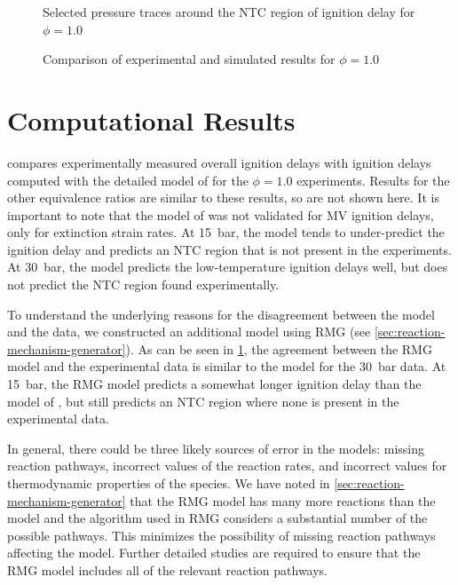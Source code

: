 \documentclass[12pt]{../ussci}
\begin{document}
\begin{figure}[htb]
    \begin{minipage}[t]{0.48\textwidth}
        \centering
        \resizebox{\linewidth}{!}{}
        \caption{Selected pressure traces around the NTC region of ignition delay for $\phi=1.0$}
        \label{fig:pressure-traces}
    \end{minipage}\hfill%
    \begin{minipage}[t]{0.48\textwidth}
        \centering
        \resizebox{\linewidth}{!}{}
        \caption{Comparison of experimental and simulated results for $\phi=1.0$}
        \label{fig:simulation-comparison}
    \end{minipage}
\end{figure}

\section{Computational Results}\label{sec:computational-results}

 compares experimentally measured overall
ignition delays with ignition delays computed with the detailed model of
\textcite{Dievart2013} for the $\phi=1.0$ experiments. Results for the other
equivalence ratios are similar to these results, so are not shown here. It is
important to note that the model of \textcite{Dievart2013} was not validated for
MV ignition delays, only for extinction strain rates. At \SI{15}{\bar}, the
model tends to under-predict the ignition delay and predicts an NTC region that
is not present in the experiments. At \SI{30}{\bar}, the model predicts the
low-temperature ignition delays well, but does not predict the NTC region found
experimentally.

To understand the underlying reasons for the disagreement between the
\textcite{Dievart2013} model and the data, we constructed an additional model
using RMG (see \cref{sec:reaction-mechanism-generator}). As can be seen in
\cref{fig:simulation-comparison}, the agreement between the RMG model and the
experimental data is similar to the \textcite{Dievart2013} model for the
\SI{30}{\bar} data. At \SI{15}{\bar}, the RMG model predicts a somewhat longer
ignition delay than the model of \textcite{Dievart2013}, but still predicts an
NTC region where none is present in the experimental data.

In general, there could be three likely sources of error in the models: missing
reaction pathways, incorrect values of the reaction rates, and incorrect values
for thermodynamic properties of the species. We have noted in
\cref{sec:reaction-mechanism-generator} that the RMG model has many more
reactions than the \textcite{Dievart2013} model and the algorithm used in RMG
considers a substantial number of the possible pathways. This minimizes the
possibility of missing reaction pathways affecting the model. Further detailed
studies are required to ensure that the RMG model includes all of the relevant
reaction pathways.
\end{document}
